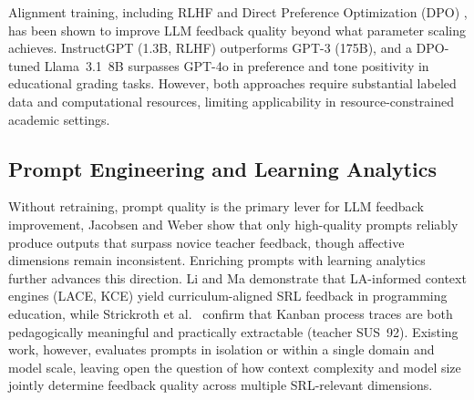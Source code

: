 \documentclass[conference,a4paper]{IEEEtran}
\begin{document}
Alignment training, including RLHF \cite{ouyang2022traininglanguagemodelsfollow}
and Direct Preference Optimization
(DPO) \cite{woodrow2025dpo_feedback}, has been shown to
improve LLM feedback quality beyond what parameter scaling
achieves. InstructGPT (1.3B, RLHF) outperforms GPT-3 (175B),
and a DPO-tuned Llama~3.1~8B surpasses GPT-4o in preference
and tone positivity in educational grading tasks. However,
both approaches require substantial labeled data and
computational resources, limiting applicability in
resource-constrained academic settings.

\subsection{Prompt Engineering and Learning Analytics}

Without retraining, prompt quality is the primary lever for
LLM feedback improvement, Jacobsen and Weber
\cite{jacobsen2025promises} show that only high-quality
prompts reliably produce outputs that surpass novice teacher
feedback, though affective dimensions remain inconsistent.
Enriching prompts with learning analytics further advances
this direction. Li and Ma
\cite{li2025designaipoweredtoolselfregulation} demonstrate
that LA-informed context engines (LACE, KCE) yield
curriculum-aligned SRL feedback in programming education,
while Strickroth et al.\ \cite{strickroth2022kanban} confirm
that Kanban process traces are both pedagogically meaningful
and practically extractable (teacher SUS~92). Existing work,
however, evaluates prompts in isolation or within a single
domain and model scale, leaving open the question of how
context complexity and model size jointly determine feedback
quality across multiple SRL-relevant dimensions.


\end{document}
